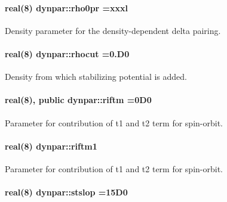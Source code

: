 \paragraph[{\texorpdfstring{rho0pr}{rho0pr}}]{\setlength{\rightskip}{0pt plus 5cm}real(8) dynpar\+::rho0pr =xxxl}\hypertarget{namespacedynpar_a14f4c76bd326e0be0d0b847314f439b9}{}\label{namespacedynpar_a14f4c76bd326e0be0d0b847314f439b9}


Density parameter for the density-\/dependent delta pairing. 

\paragraph[{\texorpdfstring{rhocut}{rhocut}}]{\setlength{\rightskip}{0pt plus 5cm}real(8) dynpar\+::rhocut =0.\+D0}\hypertarget{namespacedynpar_ad4f057977601477d6541c2cca2dd27d4}{}\label{namespacedynpar_ad4f057977601477d6541c2cca2dd27d4}


Density from which stabilizing potential is added. 

\paragraph[{\texorpdfstring{riftm}{riftm}}]{\setlength{\rightskip}{0pt plus 5cm}real(8), public dynpar\+::riftm =0\+D0}\hypertarget{namespacedynpar_adeb7487b44f19e9008cc8b3475503559}{}\label{namespacedynpar_adeb7487b44f19e9008cc8b3475503559}


Parameter for contribution of t1 and t2 term for spin-\/orbit. 

\paragraph[{\texorpdfstring{riftm1}{riftm1}}]{\setlength{\rightskip}{0pt plus 5cm}real(8) dynpar\+::riftm1}\hypertarget{namespacedynpar_a5a55fded8acc95ce6310835c6917bb99}{}\label{namespacedynpar_a5a55fded8acc95ce6310835c6917bb99}


Parameter for contribution of t1 and t2 term for spin-\/orbit. 

\paragraph[{\texorpdfstring{stslop}{stslop}}]{\setlength{\rightskip}{0pt plus 5cm}real(8) dynpar\+::stslop =15\+D0}\hypertarget{namespacedynpar_a35401f37918ab6873a9141343fd0ecc7}{}\label{namespacedynpar_a35401f37918ab6873a9141343fd0ecc7}


